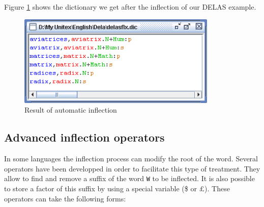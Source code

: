 \bigskip
\noindent Figure \ref{fig-inflection-result} shows the dictionary we get after the inflection of 
our DELAS example.

\bigskip
\begin{figure}[!ht]
\begin{center}
\includegraphics[width=9.5cm]{resources/img/fig3-9.png}
\caption{Result of automatic inflection\label{fig-inflection-result}}
\end{center}
\end{figure}
\subsection{Advanced inflection operators}
\label{advanced-inflection-operators}

In some languages the inflection process can modify the root of the word.
Several operators have been developped in order to facilitate this type of treatment. 
They allow to find and remove a suffix of the word \verb+W+ to be inflected.
It is also possible to store a factor of this suffix by using a special variable (\$ or ${\pounds}$).
These operators can take the following forms:

